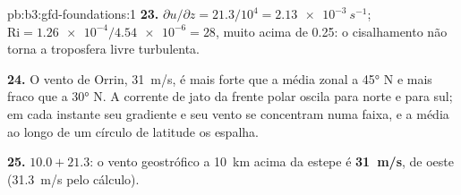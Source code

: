 \begin{solution}{pb:b3:gfd-foundations:1}
\textbf{23.} $\partial u/\partial z = 21.3/10^4 = \qty{2.13e-3}{s^{-1}}$;
$\mathrm{Ri} = \num{1.26e-4}/\num{4.54e-6} = 28$, muito acima de 0.25: o
cisalhamento não torna a troposfera livre turbulenta.

\textbf{24.} O vento de Orrin, \qty{31}{m/s}, é mais forte que a média
zonal a \ang{45} N e mais fraco que a \ang{30} N. A corrente de jato da frente polar
oscila para norte e para sul; em cada instante seu gradiente e seu vento se
concentram numa faixa, e a média ao longo de um círculo de latitude os espalha.

\textbf{25.} $10.0 + 21.3$: o vento geostrófico a \qty{10}{km} acima da
estepe é \textbf{\qty[text-series-to-math=true]{31}{m/s}}, de oeste
(\qty{31.3}{m/s} pelo cálculo).
\end{solution}

